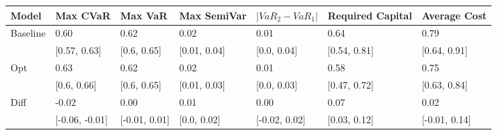 \begin{tabular}{lllllll}
\toprule
   Model &       Max CVaR &       Max VaR &  Max SemiVar & $|VaR_2 - VaR_1|$ & Required Capital &  Average Cost \\
\midrule
Baseline &           0.60 &          0.62 &         0.02 &              0.01 &             0.64 &          0.79 \\
         &   [0.57, 0.63] &   [0.6, 0.65] & [0.01, 0.04] &       [0.0, 0.04] &     [0.54, 0.81] &  [0.64, 0.91] \\
     Opt &           0.63 &          0.62 &         0.02 &              0.01 &             0.58 &          0.75 \\
         &    [0.6, 0.66] &   [0.6, 0.65] & [0.01, 0.03] &       [0.0, 0.03] &     [0.47, 0.72] &  [0.63, 0.84] \\
    Diff &          -0.02 &          0.00 &         0.01 &              0.00 &             0.07 &          0.02 \\
         & [-0.06, -0.01] & [-0.01, 0.01] &  [0.0, 0.02] &     [-0.02, 0.02] &     [0.03, 0.12] & [-0.01, 0.14] \\
\bottomrule
\end{tabular}
